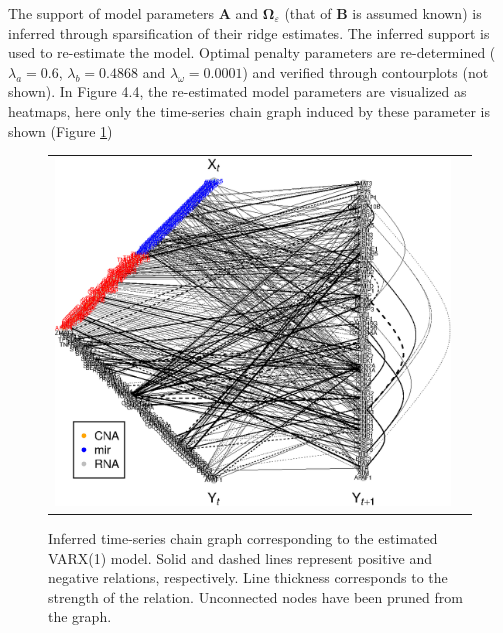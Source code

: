 {The support of model parameters $\mathbf{A}$ and $\boldsymbol{\Omega}_{\varepsilon}$ (that of $\mathbf{B}$ is assumed known) is inferred through sparsification of their ridge estimates. The inferred support is used to re-estimate the model. Optimal penalty parameters are re-determined ($\lambda_a=0.6$, $\lambda_b=0.4868$ and $\lambda_{\omega}=0.0001$) and verified through contourplots (not shown). In Figure 4.4, \cite{Supp2018} the re-estimated model parameters are visualized as heatmaps, here only the time-series chain graph induced by these parameter is shown (Figure \ref{fig:graphVARX1})

\begin{figure}[h!]
\centering
\begin{tabular}{cc}
\includegraphics[scale=0.6]{Figure_17.eps}
\end{tabular}
\caption{Inferred time-series chain graph corresponding to the estimated VARX(1) model. Solid and dashed lines represent positive and negative relations, respectively. Line thickness corresponds to the strength of the relation. Unconnected nodes have been pruned from the graph.}
\label{fig:graphVARX1}
\end{figure}

}
